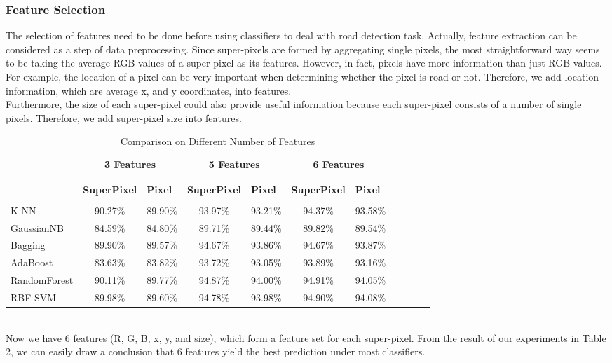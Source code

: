 \documentclass{article} %
\begin{document}
\subsubsection{Feature Selection}
The selection of features need to be done before using classifiers to deal with road detection task. Actually, feature extraction can be considered as a step of data preprocessing. Since super-pixels are formed by aggregating single pixels, the most straightforward way seems to be taking the average RGB values of a super-pixel as its features. However, in fact, pixels have more information than just RGB values. For example, the location of a pixel can be very important when determining whether the pixel is road or not. Therefore, we add location information, which are average x, and y coordinates, into features. \\

Furthermore, the size of each super-pixel could also provide useful information because each super-pixel consists of a number of single pixels. Therefore, we add super-pixel size into features.\\
\begin{table}[h]
\centering
\caption{Comparison on Different Number of Features}
\begin{tabular}{lclclclc|c|c|c|}
\\
&\multicolumn{2}{|c|}{\bf 3 Features} & \multicolumn{2}{|c|}{\bf 5 Features} & \multicolumn{2}{|c|}{\bf 6 Features} \\
\\ \hline \\
&\textbf{SuperPixel} &\textbf{Pixel} &\textbf{SuperPixel} &\textbf{Pixel} &\textbf{SuperPixel} &\textbf{Pixel} \\
\\
K-NN	 		 &90.27\% &89.90\% &93.97\% &93.21\% &94.37\% &93.58\% \\
GaussianNB	 &84.59\%	 &84.80\%	 &89.71\% &89.44\% &89.82\% &89.54\% \\
Bagging 		 &89.90\%	 &89.57\%	 &94.67\% &93.86\% &94.67\% &93.87\% \\
AdaBoost 		 &83.63\%	 &83.82\%	 &93.72\% &93.05\% &93.89\% &93.16\% \\
RandomForest  &90.11\%	 &89.77\%	 &94.87\% &94.00\% &94.91\% &94.05\% \\
RBF-SVM		 &89.98\%	 &89.60\%	 &94.78\% &93.98\% &94.90\% &94.08\% \\
\end{tabular}
\end{table}
\\
Now we have 6 features (R, G, B, x, y, and size), which form a feature set for each super-pixel. From the result of our experiments in Table 2, we can easily draw a conclusion that 6 features yield the best prediction under most classifiers.\\
\end{document}
